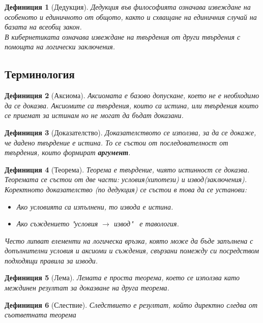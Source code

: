 \documentclass[fleqn, 12pt]{article}
\newtheorem{definition}{Дефиниция}[subsection]
\begin{document}
\begin{definition}[Дедукция]
Дедукция във философията означава извеждане на особеното и единичното от общото, както и схващане на единичния случай на базата на всеобщ закон. \\
В кибернетиката означава извеждане на твърдения от други твърдения с помощта на логически заключения.
\end{definition}

\subsection{Терминология}

\begin{definition}[Аксиома]
Аксиомата е базово допускане, което не е необходимо да се доказва. 
Аксиомите са твърдения, които са истина, или твърдения които се приемат за истинам но не могат да бъдат доказани. 
\end{definition}

\begin{definition}[Доказателство]
Доказателството се използва, за да се докаже, че дадено твърдение е истина. То се състои от последователност от твърдения, които формират \textbf{аргумент}.
\end{definition}

\begin{definition}[Теорема]
Теорема е твърдение, чиято истинност се доказва. \\
Теоремата се състои от две части: условия(хипотези) и  извод(заключения). \\
Коректното доказателство (по дедукция) се състои в това да се установи: 
\begin{itemize}
	\item Ако условията са изпълнени, то извода е истина.
	\item Ако съждението "условия $\rightarrow$ извод" \, е тавология.
\end{itemize}
Често липват елементи на логическа връзка, която може да бъде запълнена с допълнителни условия и аксиоми и съждения, свързани помежду си посредством подходящи правила за изводи. 
\end{definition}

\begin{definition}[Лема]
Лемата е проста теорема, което се използва като междинен резултат за доказване на друга теорема. 
\end{definition}

\begin{definition}[Слествие]
Следствието е резултат, който директно следва от съответната теорема
\end{definition}
\end{document}
